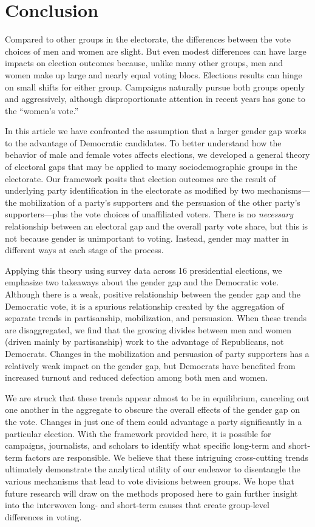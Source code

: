 \documentclass[12pt
               ,final
               ]{article}
\begin{document}
\section*{Conclusion}

Compared to other groups in the electorate, the differences between the vote choices of men and women are slight. But even modest differences can have large impacts on election outcomes because, unlike many other groups, men and women make up large and nearly equal voting blocs. Elections results can hinge on small shifts for either group. Campaigns naturally pursue both groups openly and aggressively, although disproportionate attention in recent years has gone to the ``women's vote.'' 

In this article we have confronted the assumption that a larger gender gap works to the advantage of Democratic candidates. To better understand how the behavior of male and female votes affects elections, we developed a general theory of electoral gaps that may be applied to many sociodemographic groups in the electorate. Our framework posits that election outcomes are the result of underlying party identification in the electorate as modified by two mechanisms---the mobilization of a party's supporters and the persuasion of the other party's supporters---plus the vote choices of unaffiliated voters. There is no \emph{necessary} relationship between an electoral gap and the overall party vote share, but this is not because gender is unimportant to voting. Instead, gender may matter in different ways at each stage of the process. 

Applying this theory using survey data across 16 presidential elections, we emphasize two takeaways about the gender gap and the Democratic vote. Although there is a weak, positive relationship between the gender gap and the Democratic vote, it is a spurious relationship created by the aggregation of separate trends in partisanship, mobilization, and persuasion. When these trends are disaggregated, we find that the growing divides between men and women (driven mainly by partisanship) work to the advantage of Republicans, not Democrats. Changes in the mobilization and persuasion of party supporters has a relatively weak impact on the gender gap, but Democrats have benefited from increased turnout and reduced defection among both men and women.

We are struck that these trends appear almost to be in equilibrium, canceling out one another in the aggregate to obscure the overall effects of the gender gap on the vote. Changes in just one of them could advantage a party significantly in a particular election. With the framework provided here, it is possible for campaigns, journalists, and scholars to identify what specific long-term and short-term factors are responsible. We believe that these intriguing cross-cutting trends ultimately demonstrate the analytical utility of our endeavor to disentangle the various mechanisms that lead to vote divisions between groups. We hope that future research will draw on the methods proposed here to gain further insight into the interwoven long- and short-term causes that create group-level differences in voting.
\end{document}
